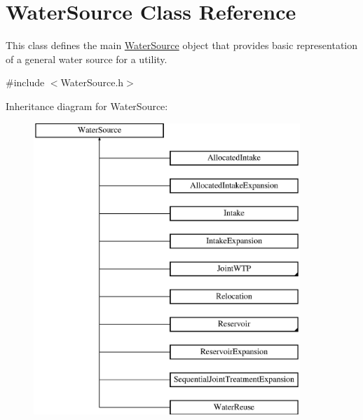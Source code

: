 \hypertarget{classWaterSource}{}\section{Water\+Source Class Reference}
\label{classWaterSource}


This class defines the main {\ttfamily \mbox{\hyperlink{classWaterSource}{Water\+Source}}} object that provides basic representation of a general water source for a utility.  




{\ttfamily \#include $<$Water\+Source.\+h$>$}

Inheritance diagram for Water\+Source\+:\begin{figure}[H]
\begin{center}
\leavevmode
\includegraphics[height=11.000000cm]{classWaterSource}
\end{center}
\end{figure}
